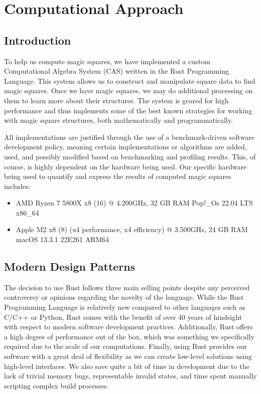 \documentclass{rhumj_new}
\begin{document}
\section{Computational Approach}

\subsection{Introduction}

To help us compute magic squares, we have implemented a custom Computational Algebra System
(CAS) written in the Rust Programming Language. This system allows us to construct and manipulate
square data to find magic squares. Once we have magic squares, we may do additional processing on
them to learn more about their structures. The system is geared for high performance and thus
implements some of the best known strategies for working with magic square structures, both
mathematically and programmatically.

All implementations are justified through the use of a benchmark-driven software development
policy, meaning certain implementations or algorithms are added, used, and possibly
modified based on benchmarking and profiling results. This, of course, is highly dependent on the
hardware being used. Our specific hardware being used to quantify and express the results of
computed magic squares includes:

\begin{itemize}
  \item AMD Ryzen 7 5800X x8 (16) @ 4.200GHz, 32 GB RAM \textemdash{}  Pop!\_Os 22.04 LTS x86\_64
  \item Apple M2 x8 (8) (x4 performance, x4 efficiency) @ 3.500GHz, 24 GB RAM \textemdash{} macOS
        13.3.1
        22E261 ARM64
\end{itemize}

\subsection{Modern Design Patterns}

The decision to use Rust follows three main selling points despite any perceived controversy
or opinions regarding the novelty of the language. While the Rust Programming Language is
relatively new compared to other languages such as C/C++ or Python, Rust comes with the benefit of
over 40 years of hindsight with respect to modern software development practices. Additionally,
Rust offers a high degree of performance out of the box, which was something we specifically
required due to the scale of our computations. Finally, using Rust provides our software with a
great deal of flexibility as we can create low-level solutions using high-level interfaces. We also
save quite a bit of time in development due to the lack of trivial memory bugs, representable
invalid states, and time spent manually scripting complex build processes.
\end{document}
